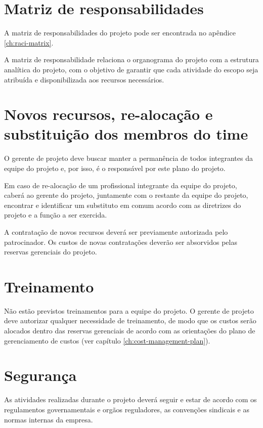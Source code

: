 \section{Matriz de responsabilidades}

A matriz de responsabilidades do projeto pode ser encontrada no apêndice \ref{ch:raci-matrix}.

A matriz de responsabilidade relaciona o organograma do projeto com a estrutura analítica do projeto, com o objetivo de garantir que cada atividade do escopo seja atribuída e disponibilizada aos recursos necessários.

\section{Novos recursos, re-alocação e substituição dos membros do time}

O gerente de projeto deve buscar manter a permanência de todos integrantes da equipe do projeto e, por isso, é o responsável por este plano do projeto.

Em caso de re-alocação de um profissional integrante da equipe do projeto, caberá ao gerente do projeto, juntamente com o restante da equipe do projeto, encontrar e identificar um substituto em comum acordo com as diretrizes do projeto e a função a ser exercida.

A contratação de novos recursos deverá ser previamente autorizada pelo patrocinador. Os custos de novas contratações deverão ser absorvidos pelas reservas gerenciais do projeto.

\section{Treinamento}

Não estão previstos treinamentos para a equipe do projeto. O gerente de projeto deve autorizar qualquer necessidade de treinamento, de modo que os custos serão alocados dentro das reservas gerenciais de acordo com as orientações do plano de gerenciamento de custos (ver capítulo \ref{ch:cost-management-plan}).

\section{Segurança}

As atividades realizadas durante o projeto deverá seguir e estar de acordo com os regulamentos governamentais e orgãos reguladores, as convenções sindicais e as normas internas da empresa.

